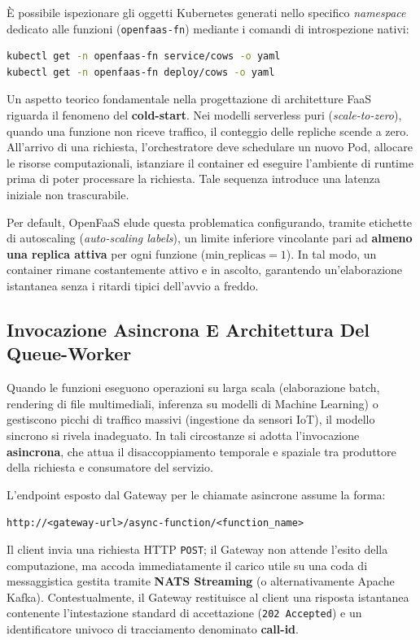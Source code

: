\documentclass[11pt, a4paper]{article}
\begin{document}
È possibile ispezionare gli oggetti Kubernetes generati nello specifico \emph{namespace} dedicato alle funzioni (\texttt{openfaas-fn}) mediante i comandi di introspezione nativi:
\begin{lstlisting}[language=bash]
kubectl get -n openfaas-fn service/cows -o yaml
kubectl get -n openfaas-fn deploy/cows -o yaml
\end{lstlisting}

Un aspetto teorico fondamentale nella progettazione di architetture FaaS riguarda il fenomeno del \textbf{cold-start}. Nei modelli serverless puri (\emph{scale-to-zero}), quando una funzione non riceve traffico, il conteggio delle repliche scende a zero. All'arrivo di una richiesta, l'orchestratore deve schedulare un nuovo Pod, allocare le risorse computazionali, istanziare il container ed eseguire l'ambiente di runtime prima di poter processare la richiesta. Tale sequenza introduce una latenza iniziale non trascurabile.

Per default, OpenFaaS elude questa problematica configurando, tramite etichette di autoscaling (\emph{auto-scaling labels}), un limite inferiore vincolante pari ad \textbf{almeno una replica attiva} per ogni funzione (\(\text{min\_replicas} = 1\)). In tal modo, un container rimane costantemente attivo e in ascolto, garantendo un'elaborazione istantanea senza i ritardi tipici dell'avvio a freddo.

\subsection{Invocazione Asincrona E Architettura Del Queue-Worker}

Quando le funzioni eseguono operazioni su larga scala (elaborazione batch, rendering di file multimediali, inferenza su modelli di Machine Learning) o gestiscono picchi di traffico massivi (ingestione da sensori IoT), il modello sincrono si rivela inadeguato. In tali circostanze si adotta l'invocazione \textbf{asincrona}, che attua il disaccoppiamento temporale e spaziale tra produttore della richiesta e consumatore del servizio.

L'endpoint esposto dal Gateway per le chiamate asincrone assume la forma:
\begin{center}
    \texttt{http://<gateway-url>/async-function/<function\_name>}
\end{center}

Il client invia una richiesta HTTP \texttt{POST}; il Gateway non attende l'esito della computazione, ma accoda immediatamente il carico utile su una coda di messaggistica gestita tramite \textbf{NATS Streaming} (o alternativamente Apache Kafka). Contestualmente, il Gateway restituisce al client una risposta istantanea contenente l'intestazione standard di accettazione (\texttt{202 Accepted}) e un identificatore univoco di tracciamento denominato \textbf{call-id}.
\end{document}
